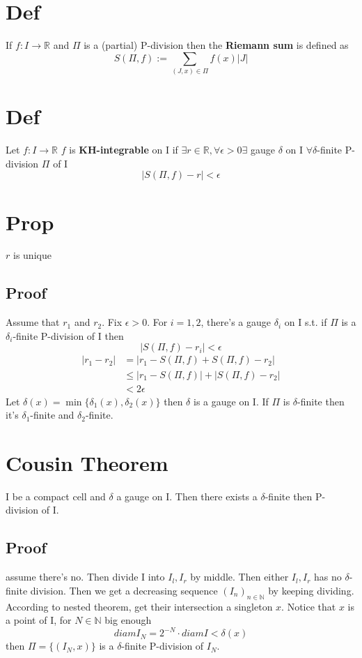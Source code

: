 \documentclass{book}
\newcommand{\abs}[1]{\left\lvert #1 \right\rvert}
\begin{document}
\section{Def}
If $f:I\rightarrow\mathbb R$ and $\Pi$ is a (partial) P-division then the \textbf{Riemann sum} is defined as$$S(\Pi,f):=\sum\limits_{(J,x)\in \Pi}f(x)\abs{J}$$
\section{Def}
Let $f:I\rightarrow\mathbb R$ $f$ is \textbf{KH-integrable} on I if $\exists r\in \mathbb R, \forall \epsilon>0\exists$ gauge $\delta$ on I $\forall \delta$-finite P-division $\Pi$ of I$$\abs{S(\Pi,f)-r}<\epsilon$$
\section{Prop}$r$ is unique
\subsection*{Proof}
Assume that $r_1$ and $r_2$. Fix $\epsilon>0$. For $i=1,2$, there's a gauge $\delta_i$ on I s.t. if $\Pi$ is a $\delta_i$-finite P-division of I then $$\abs{S(\Pi,f)-r_i}<\epsilon$$
$$\begin{aligned}
    \abs{r_1-r_2}&=\abs{r_1-S(\Pi,f)+S(\Pi,f)-r_2}\\ &\leq\abs{r_1-S(\Pi,f)}+\abs{S(\Pi,f)-r_2}\\ &<2\epsilon
\end{aligned}$$
Let $\delta(x)=\min\{\delta_1(x),\delta_2(x)\}$ then $\delta$ is a gauge on I. If $\Pi$ is $\delta$-finite then it's $\delta_1$-finite and $\delta_2$-finite.
\section{Cousin Theorem}
I be a compact cell and $\delta$ a gauge on I. Then there exists a $\delta$-finite then P-division of I.
\subsection*{Proof}
assume there's no. Then divide I into $I_l,I_r$ by middle. Then either $I_l,I_r$ has no $\delta$-finite division. Then we get a decreasing sequence $(I_n)_{n\in \mathbb N}$ by keeping dividing. According to nested theorem, get their intersection a singleton $x$. Notice that $x$ is a point of I, for $N\in \mathbb N$ big enough
$$diam I_N=2^{-N}\cdot diam I<\delta(x)$$then $\Pi=\{(I_N,x)\}$ is a $\delta$-finite P-division of $I_N$.
\end{document}
